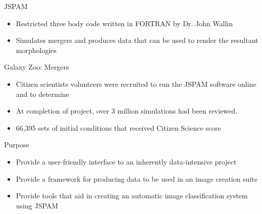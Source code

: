 \documentclass{beamer}
\begin{document}
\begin{frame}{JSPAM}
    \begin{itemize}
        \item Restricted three body code written in FORTRAN by Dr. John Wallin
            \cite{Wallin2016}
        \item Simulates mergers and produces data that can be used to
            render the resultant morphologies
    \end{itemize}
\end{frame}

\begin{frame}{Galaxy Zoo: Mergers \cite{holincheckThesis}}
    \begin{itemize}
        \item Citizen scientists volunteers were recruited to run the
            JSPAM software online and to determine 
        \item At completion of project, over 3 million simulations had been
            reviewed.
        \item 66,395 sets of initial conditions that received Citizen Science
            score
    \end{itemize}
\end{frame}


\begin{frame}{Purpose}
    \begin{itemize}
        \item Provide a user-friendly interface to an inherently data-intensive
            project
        \item Provide a framework for producing data to be used in an
                image creation suite
        \item Provide tools that aid in creating an automatic image
        classification system using JSPAM
    \end{itemize}
\end{frame}
\end{document}
